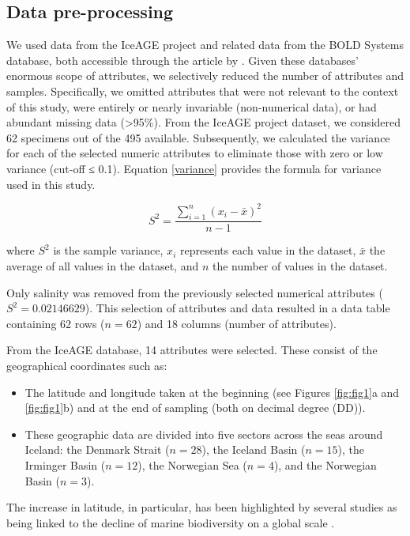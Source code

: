 \subsection{Data pre-processing}
We used data from the IceAGE project and related data from the BOLD Systems database, both accessible through the article by \citep{uhlir_adding_2021}. Given these databases' enormous scope of attributes, we selectively reduced the number of attributes and samples. Specifically, we omitted attributes that were not relevant to the context of this study, were entirely or nearly invariable (non-numerical data), or had abundant missing data (>95\%). From the IceAGE project dataset, we considered 62 specimens out of the 495 available. Subsequently, we calculated the variance for each of the selected numeric attributes to eliminate those with zero or low variance (cut-off ≤ 0.1). Equation \ref{variance} provides the formula for variance used in this study.

\begin{equation}\label{variance}
    S^2 = \frac{\sum_{i=1}^{n} (x_i - \bar{x})^2}{n-1}
\end{equation}

where $S^2$ is the sample variance, $x_i$ represents each value in the dataset, $\bar{x}$ the average of all values in the dataset, and $n$ the number of values in the dataset.

Only salinity was removed from the previously selected numerical attributes ($S^2 = 0.02146629$). This selection of attributes and data resulted in a data table containing 62 rows ($n=62$) and 18 columns (number of attributes). 

From the IceAGE database, 14 attributes were selected. These consist of the geographical coordinates such as: 

\begin{itemize}
\item The latitude and longitude taken at the beginning (see Figures \ref{fig:fig1}a and \ref{fig:fig1}b) and at the end of sampling (both on decimal degree (DD)).
\item These geographic data are divided into five sectors across the seas around Iceland: the Denmark Strait ($n=28$), the Iceland Basin ($n=15$), the Irminger Basin ($n=12$), the Norwegian Sea ($n=4$), and the Norwegian Basin ($n=3$). 
\end{itemize}

The increase in latitude, in particular, has been highlighted by several studies as being linked to the decline of marine biodiversity on a global scale \citep{lambshead_latitudinal_2000, gage_diversity_2004}. 

